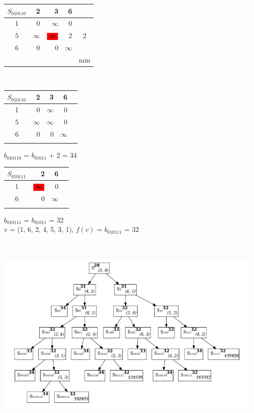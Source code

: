 \documentclass[12pt]{article}
\begin{document}
\begin{flushleft}
 \begin{tabular}{c||rrr||c}
$S_{010110}$  &2 & 3  & 6 & \\
\hline
\hline
1 & 0 & $\infty$ & 0 & \\
5 & $\infty$ & $\colorbox{red}{$\infty$}$ & 2 &2\\
6 & 0 & 0  & $\infty$ & \\
\hline
\hline
 & &  &   &min \\
\end{tabular}
$\qquad $ 
 \begin{tabular}{c||rrr||c}
$S_{010110}$  &2 & 3  & 6 & \\
\hline
\hline
1 & 0 & $\infty$ & 0 & \\
5 & $\infty$ & $\infty$ & 0 &\\
6 & 0 & 0  & $\infty$ & \\
\hline
\hline
 & &  &   & \\
\end{tabular}
\end{flushleft}

$b_{010110}$ = $b_{01011}$ + 2 = 34\\

\begin{flushleft}
 \begin{tabular}{c||rr||c}
$S_{010111}$  &2   & 6 & \\
\hline
\hline
1 & $\colorbox{red}{$\infty$}$      & 0 & \\
6 & 0   & $\infty$ & \\
\hline
\hline
  &   & \\
\end{tabular}
\end{flushleft}

$b_{010111}$ = $b_{01011}$  = 32\\



v = (1, 6, 2, 4, 5, 3, 1), $f(v)$ = $b_{010111}$  = 32\\
\begin{flushleft}
 
\includegraphics[width = 15cm, height = 10cm]{pictures/picture_01.jpg}\\
\end{flushleft}
\vspace{3cm}
\end{document}
